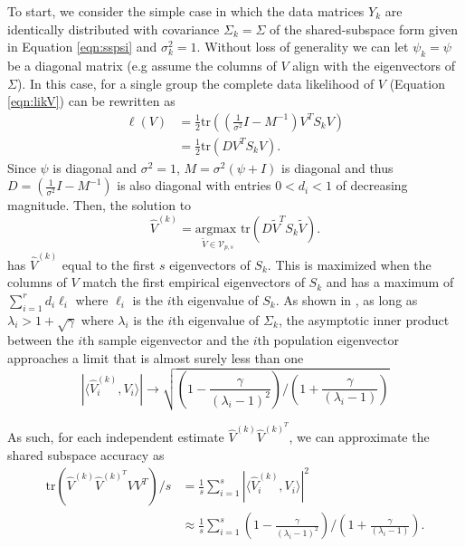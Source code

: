 \documentclass[12pt]{article}
\newcommand{\tr}{\text{tr}}
\begin{document}
To start, we consider the simple case in which the data matrices $Y_k$
are identically distributed with covariance $\Sigma_k=\Sigma$ of the
shared-subspace form given in Equation \ref{eqn:sspsi} and
$\sigma_k^2 = 1$.  Without loss of generality we can let
$\psi_k = \psi$ be a diagonal matrix (e.g assume the columns of $V$
align with the eigenvectors of $\Sigma$).  In this case, for a single
group the complete data likelihood of $V$ (Equation \ref{eqn:likV})
can be rewritten as
%
\begin{align*}
\ell(V) &=\frac{1}{2}\tr\left((\frac{1}{\sigma^2}I-M^{-1})V^T
  S_kV\right)\\
&=\frac{1}{2}\tr\left(DV^TS_kV\right).
\end{align*}
%
Since $\psi$ is diagonal and $\sigma^2=1$, 
$M = \sigma^2(\psi + I)$ is diagonal and thus
$D = (\frac{1}{\sigma^2}I-M^{-1})$ is also diagonal with entries
$0 < d_i < 1$ of decreasing magnitude.  Then, the solution to
$$\hat{V}^{(k)} = \underset{\widetilde{V} \in \mathcal{V}_{p,
    s}}{\text{argmax }} \tr\left(D\widetilde{V}^T
  S_k\widetilde{V}\right).$$
has $\hat{V}^{(k)}$ equal to the first $s$ eigenvectors of $S_k$.  This is
maximized when the columns of $V$ match the first empirical eigenvectors of
$S_k$ and has a maximum of $\sum_{i=1}^r d_i\ell_i$ where $\ell_i$ is the
$i$th eigenvalue of $S_k$.  As shown in \citet{Paul2007}, as long as
$\lambda_i > 1 + \sqrt{\gamma}$ where $\lambda_i$ is the $i$th
eigenvalue of $\Sigma_k$, the asymptotic inner product between
the $i$th sample eigenvector and the $i$th population eigenvector
approaches a limit that is almost surely less than one
$$|\langle\hat{V}^{(k)}_i, V_i\rangle| \to \sqrt{\left(1-\frac{\gamma}{(\lambda_i - 1)^2}\right) /\left(1 +
    \frac{\gamma}{(\lambda_i - 1)}\right)} $$
%

\noindent As such, for each independent estimate
$\hat{V}^{(k)}\hat{V}^{(k)^T}$, we can approximate the shared subspace
accuracy as
\begin{align}
\nonumber \tr(\hat{V}^{(k)}\hat{V}^{(k)^T}VV^T)/s &= \frac{1}{s}\sum_{i=1}^s |\langle\hat{V}^{(k)}_i, V_i\rangle|^2\\
&\approx \frac{1}{s}\sum_{i=1}^s  \left(1-\frac{\gamma}{(\lambda_i - 1)^2}\right) /\left(1 +
    \frac{\gamma}{(\lambda_i - 1)}\right).
\label{eqn:lbound}
\end{align}
\end{document}
